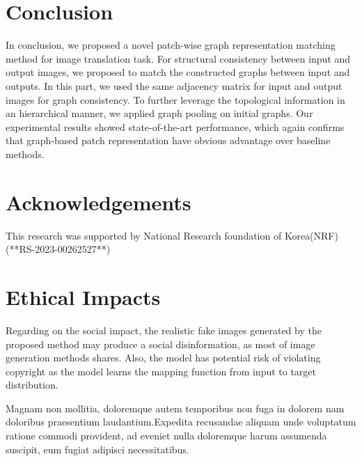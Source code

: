 \documentclass[letterpaper]{article} %
\begin{document}
\vspace{-3.13mm}
\section{Conclusion}
In conclusion, we proposed a novel patch-wise graph representation matching method for image translation task. For structural consistency between input and output images, we proposed to match the constructed graphs between input and outputs. In this part, we used the same adjacency matrix for input and output images for graph consistency. To further leverage the topological information in an hierarchical manner, we applied graph pooling on initial graphs. Our experimental results showed state-of-the-art performance, which again confirms that graph-based patch representation have obvious advantage over baseline methods.


\section{Acknowledgements}
This research was supported by National Research foundation of Korea(NRF) (**RS-2023-00262527**)

\section{Ethical Impacts}
Regarding on the social impact, the realistic fake images generated by the proposed method may produce a social disinformation, as most of image generation methods shares. Also, the model has potential risk of violating copyright as the model learns the mapping function from input to target distribution.


Magnam non mollitia, doloremque autem temporibus non fuga in dolorem nam doloribus praesentium laudantium.Expedita recusandae aliquam unde voluptatum ratione commodi provident, ad eveniet nulla doloremque harum assumenda suscipit, eum fugiat adipisci necessitatibus.\clearpage

\end{document}
